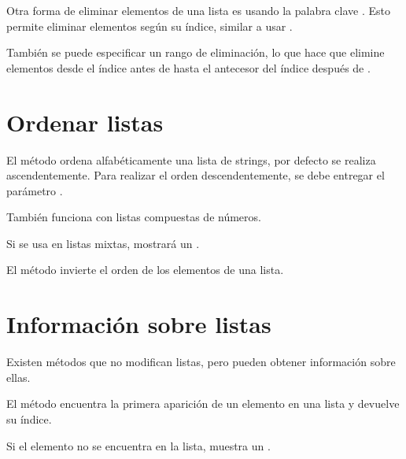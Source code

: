 Otra forma de eliminar elementos de una lista es usando la palabra clave . Esto permite eliminar elementos según su índice, similar a usar .


También se puede especificar un rango de eliminación, lo que hace que elimine elementos desde el índice antes de \ttt{:} hasta el antecesor del índice después de \ttt{:}.


\section{Ordenar listas}

El método  ordena alfabéticamente una lista de strings, por defecto se realiza ascendentemente. Para realizar el orden descendentemente, se debe entregar el parámetro .
  
  
También funciona con listas compuestas de números.


Si se usa en listas mixtas, mostrará un .


El método  invierte el orden de los elementos de una lista.
  

\section{Información sobre listas}

Existen métodos que no modifican listas, pero pueden obtener información sobre ellas.

El método  encuentra la primera aparición de un elemento en una lista y devuelve su índice.
  

Si el elemento no se encuentra en la lista, muestra un .

